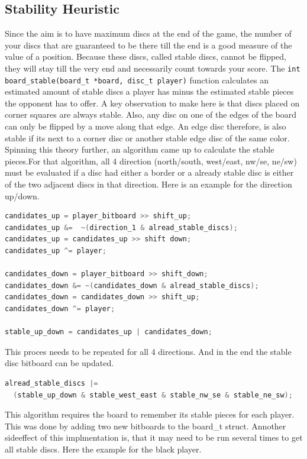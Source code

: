 \subsection{Stability Heuristic}\label{stable}
Since the aim is to have maximum discs at the end of the game, the number of your discs that are guaranteed to be there till the end is a good measure of the value of a position. Because these discs, called stable discs, cannot be flipped, they will stay till the very end and necessarily count towards your score. \newline The \verb|int board_stable(board_t *board, disc_t player)| function calculates  an estimated amount of stable discs a player has minus the estimated stable pieces the opponent has to offer. A key observation to make here is that discs placed on corner squares are always stable. Also, any disc on one of the edges of the board can only be flipped by a move along that edge. An edge disc therefore, is also stable if its next to a corner disc or another stable edge disc of the same color. Spinning this theory further, an algorithm came up to calculate the stable pieces.\newline For that algorithm, all 4 direction (north/south, west/east, nw/se, ne/sw) must be evaluated if a disc had either a border or a already stable disc is either of the two adjacent discs in that direction. Here is an example for the direction up/down.
\begin{lstlisting}[language=c]
candidates_up = player_bitboard >> shift_up;
candidates_up &=  ~(direction_1 & alread_stable_discs);
candidates_up = candidates_up >> shift down;
candidates_up ^= player;

candidates_down = player_bitboard >> shift_down;
candidates_down &= ~(candidates_down & alread_stable_discs);
candidates_down = candidates_down >> shift_up;
candidates_down ^= player;

stable_up_down = candidates_up | candidates_down;
\end{lstlisting}
\newpage
This proces needs to be repeated for all 4 directions. And in the end the stable disc bitboard can be updated.
\begin{lstlisting}[language=c]
alread_stable_discs |= 
  (stable_up_down & stable_west_east & stable_nw_se & stable_ne_sw);
\end{lstlisting}
This algorithm requires the board to remember its stable pieces for each player. This was done by adding two new bitboards to the board\_t struct. Annother sideeffect of this implmentation is, that it may need to be run several times to get all stable discs. Here the example for the black player.
